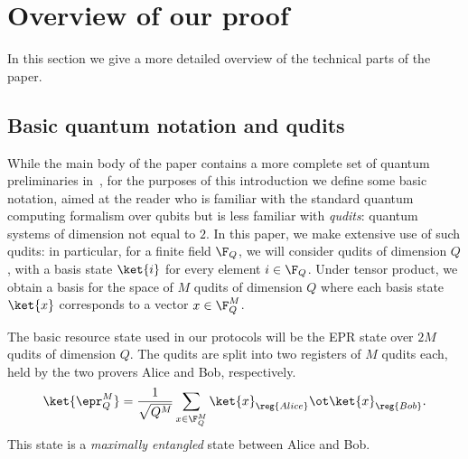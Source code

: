 \section{Overview of our proof}  \label{sec:overview}

In this section we give a more detailed overview of the technical
parts of the paper.

\subsection{Basic quantum notation and qudits}
While the main body of the paper contains a more complete set of
quantum preliminaries in~, for the purposes of this
introduction we define some basic notation, aimed at the reader who is
familiar with the standard quantum computing formalism over qubits but
is less familiar with \emph{qudits}: quantum systems of dimension not equal to $2$.
In this paper, we make extensive use of such qudits: in particular, for a finite field $\F_Q$, we will
consider qudits of dimension $Q$, with a basis state $\ket{i}$ for
every element $i \in \F_Q$. Under tensor product, we obtain a basis
for the space of $M$ qudits of dimension $Q$ where each basis state
$\ket{x}$ corresponds to a vector $x \in \F_Q^M$.

The basic resource state used in our protocols will be the EPR state
over $2M$ qudits of dimension $Q$. The qudits are split into two
registers of $M$ qudits each, held by the two provers Alice and Bob,
respectively.
\[ \ket{\epr_Q^M} = \frac{1}{\sqrt{Q^M}} \sum_{x \in \F_Q^M} \ket{x}_{\reg{Alice}}
  \ot \ket{x}_{\reg{Bob}}. \]
This state is a \emph{maximally entangled} state between Alice and
Bob.

